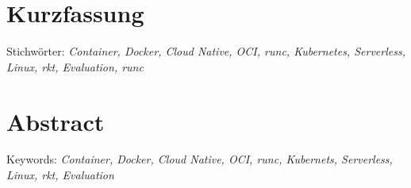 
\chapter{Kurzfassung}
\label{chap:kurzfassung}

Stichwörter: \textit{Container, Docker, Cloud Native, OCI, runc, Kubernetes, Serverless, Linux, rkt, Evaluation, runc}
\begingroup
\let\cleardoublepage\relax
\chapter{Abstract}
\label{chap:Abstract}

Keywords: \textit{Container, Docker, Cloud Native, OCI, runc, Kubernets, Serverless, Linux, rkt, Evaluation}
\endgroup